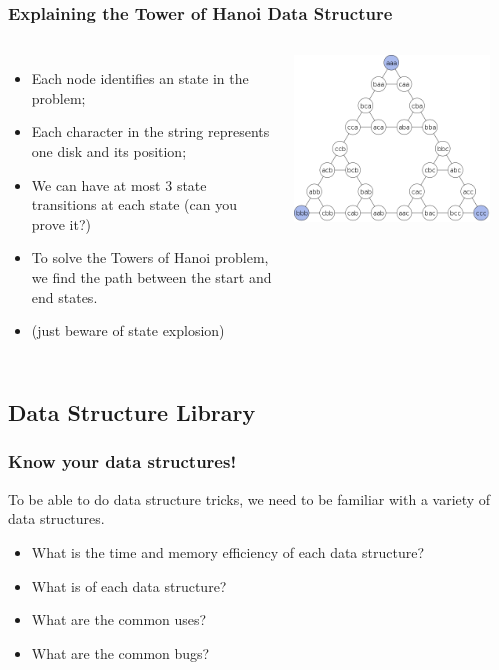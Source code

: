 \documentclass{beamer}
\begin{document}
\begin{frame}
  \frametitle{Explaining the Tower of Hanoi Data Structure}
  \begin{columns}[c]
    \begin{itemize}
    \item Each node identifies an state in the problem;
    \item Each character in the string represents one disk and its
      position;
    \item We can have at most 3 state transitions at each state (can
      you prove it?)
    \item To solve the Towers of Hanoi problem, we find the path
      between the start and end states.
    \item (just beware of state explosion)
    \end{itemize}
    \includegraphics[width=0.9\textwidth]{img/hanoi_graph}
    \vfill
  \end{columns}
\end{frame}

\subsection{Data Structure Library}

\begin{frame}
  \frametitle{Know your data structures!}
  \begin{block}{}
    To be able to do data structure tricks, we need to be familiar
    with a variety of data structures.
  \end{block}

  \bigskip

  \begin{itemize}
  \item What is the time and memory efficiency of each data structure?
  \item What is  of each data structure?
  \item What are the common uses?
  \item What are the common bugs?
  \end{itemize}
  
\end{frame}
\end{document}
